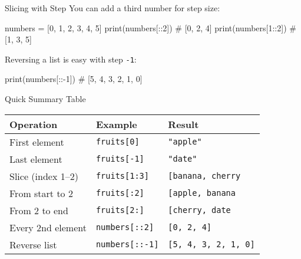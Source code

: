 \documentclass[
  letterpaper,
  DIV=11,
  numbers=noendperiod]{scrreprt}
\newenvironment{Shaded}{\begin{snugshade}}{\end{snugshade}}
\newcommand{\BuiltInTok}[1]{\textcolor[rgb]{0.00,0.23,0.31}{#1}}
\newcommand{\CommentTok}[1]{\textcolor[rgb]{0.37,0.37,0.37}{#1}}
\newcommand{\DecValTok}[1]{\textcolor[rgb]{0.68,0.00,0.00}{#1}}
\newcommand{\NormalTok}[1]{\textcolor[rgb]{0.00,0.23,0.31}{#1}}
\newcommand{\OperatorTok}[1]{\textcolor[rgb]{0.37,0.37,0.37}{#1}}
\begin{document}
Slicing with Step You can add a third number for step size:

\begin{Shaded}
\begin{Highlighting}[]
\NormalTok{numbers }\OperatorTok{=}\NormalTok{ [}\DecValTok{0}\NormalTok{, }\DecValTok{1}\NormalTok{, }\DecValTok{2}\NormalTok{, }\DecValTok{3}\NormalTok{, }\DecValTok{4}\NormalTok{, }\DecValTok{5}\NormalTok{]}
\BuiltInTok{print}\NormalTok{(numbers[::}\DecValTok{2}\NormalTok{])   }\CommentTok{\# [0, 2, 4]}
\BuiltInTok{print}\NormalTok{(numbers[}\DecValTok{1}\NormalTok{::}\DecValTok{2}\NormalTok{])  }\CommentTok{\# [1, 3, 5]}
\end{Highlighting}
\end{Shaded}

Reversing a list is easy with step \texttt{-1}:

\begin{Shaded}
\begin{Highlighting}[]
\BuiltInTok{print}\NormalTok{(numbers[::}\OperatorTok{{-}}\DecValTok{1}\NormalTok{])  }\CommentTok{\# [5, 4, 3, 2, 1, 0]}
\end{Highlighting}
\end{Shaded}

Quick Summary Table

\begin{longtable}[]{@{}lll@{}}
\toprule\noalign{}
Operation & Example & Result \\
\midrule\noalign{}
\endhead
\bottomrule\noalign{}
\endlastfoot
First element & \texttt{fruits{[}0{]}} & \texttt{"apple"} \\
Last element & \texttt{fruits{[}-1{]}} & \texttt{"date"} \\
Slice (index 1--2) & \texttt{fruits{[}1:3{]}} &
\texttt{{[}\textquotesingle{}banana\textquotesingle{},\ \textquotesingle{}cherry\textquotesingle{}{]}} \\
From start to 2 & \texttt{fruits{[}:2{]}} &
\texttt{{[}\textquotesingle{}apple\textquotesingle{},\ \textquotesingle{}banana\textquotesingle{}{]}} \\
From 2 to end & \texttt{fruits{[}2:{]}} &
\texttt{{[}\textquotesingle{}cherry\textquotesingle{},\ \textquotesingle{}date\textquotesingle{}{]}} \\
Every 2nd element & \texttt{numbers{[}::2{]}} &
\texttt{{[}0,\ 2,\ 4{]}} \\
Reverse list & \texttt{numbers{[}::-1{]}} &
\texttt{{[}5,\ 4,\ 3,\ 2,\ 1,\ 0{]}} \\
\end{longtable}
\end{document}
